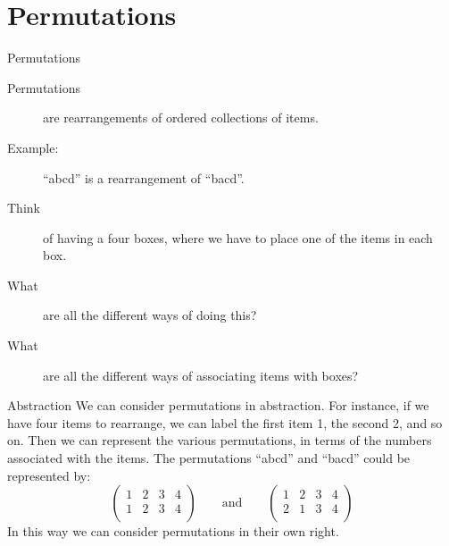 %
%
%







\section{Permutations}


\begin{frame}{Permutations}
  \begin{description}
    \item[Permutations] are rearrangements of ordered collections of items.
    \item[Example:] ``abcd'' is a rearrangement of ``bacd''.
    \item[Think] of having a four boxes, where we have to place one of the items in each box.
    \item[What] are all the different ways of doing this?
    \item[What] are all the different ways of associating items with boxes?
  \end{description}
\end{frame}

\begin{frame}{Abstraction}
    We can consider permutations in abstraction.
    For instance, if we have four items to rearrange, we can label the first item 1, the second 2, and so on.
    Then we can represent the various permutations, in terms of the numbers associated with the items.
    The permutations ``abcd'' and ``bacd'' could be represented by:
      \[ \left( \begin{array}{cccc} 1 & 2 & 3 & 4 \\ 1 & 2 & 3 & 4 \\ \end{array} \right) 
          \qquad \textrm{and} \qquad
         \left( \begin{array}{cccc} 1 & 2 & 3 & 4 \\ 2 & 1 & 3 & 4 \\ \end{array} \right) \]
    In this way we can consider permutations in their own right.
\end{frame}


